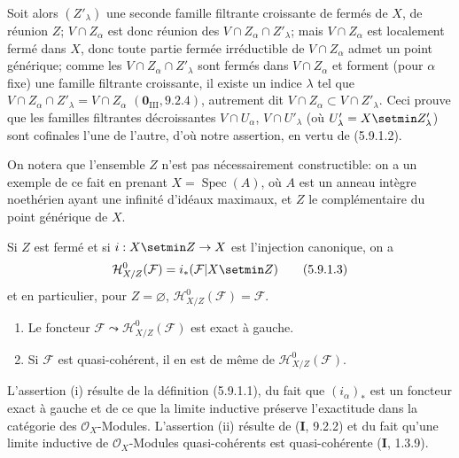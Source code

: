 \begin{env}[5.9.1]
Soit alors $(Z'_\lambda)$ une seconde famille filtrante croissante de fermés
de $X$, de réunion $Z$; $V\cap Z_\alpha$ est donc réunion des
$V\cap Z_\alpha\cap Z'_\lambda$; mais $V\cap Z_\alpha$ est localement fermé
dans $X$, donc toute partie fermée irréductible de $V\cap Z_\alpha$ admet un
point générique; comme les $V\cap Z_\alpha\cap Z'_\lambda$ sont fermés dans
$V\cap Z_\alpha$ et forment (pour $\alpha$ fixe) une famille filtrante
croissante, il existe un indice $\lambda$ tel que
$V\cap Z_\alpha\cap Z'_\lambda=V\cap Z_\alpha$
$(\mathbf{0}_{\mathrm{III}},9.2.4)$, autrement dit
$V\cap Z_\alpha\subset V\cap Z'_\lambda$. Ceci prouve que les familles
filtrantes décroissantes $V\cap U_\alpha$, $V\cap U'_\lambda$ (où
$U'_\lambda=X\setmin Z'_\lambda$) sont cofinales l'une de l'autre, d'où notre
assertion, en vertu de (5.9.1.2).
\end{env}


On notera que l'ensemble $Z$ n'est pas nécessairement constructible: on a un
exemple de ce fait en prenant $X=\operatorname{Spec}(A)$, où $A$ est un
anneau intègre noethérien ayant une infinité d'idéaux maximaux, et $Z$ le
complémentaire du point générique de $X$.

Si $Z$ est fermé et si $i:X\setmin Z\to X$ est l'injection canonique, on a
\begin{equation}
\mathcal H^0_{X/Z}(\mathcal F)=i_*(\mathcal F|X\setmin Z)
\tag{5.9.1.3}\label{IV.2.s5.9.1.3-fr}
\end{equation}
et en particulier, pour $Z=\varnothing$,
$\mathcal H^0_{X/Z}(\mathcal F)=\mathcal F$.

\begin{proposition}[5.9.2]
\label{IV.2.s5.9.2-fr}
\begin{enumerate}
\item[\textup{(i)}] Le foncteur
$\mathcal F\leadsto\mathcal H^0_{X/Z}(\mathcal F)$ est exact à gauche.
\item[\textup{(ii)}] Si $\mathcal F$ est quasi-cohérent, il en est de même de
$\mathcal H^0_{X/Z}(\mathcal F)$.
\end{enumerate}
\end{proposition}

L'assertion (i) résulte de la définition (5.9.1.1), du fait que
$(i_\alpha)_*$ est un foncteur exact à gauche et de ce que la limite
inductive préserve l'exactitude dans la catégorie des $\mathcal O_X$-Modules.
L'assertion (ii) résulte de (\textbf{I}, 9.2.2) et du fait qu'une limite inductive de
$\mathcal O_X$-Modules quasi-cohérents est quasi-cohérente (\textbf{I}, 1.3.9).

